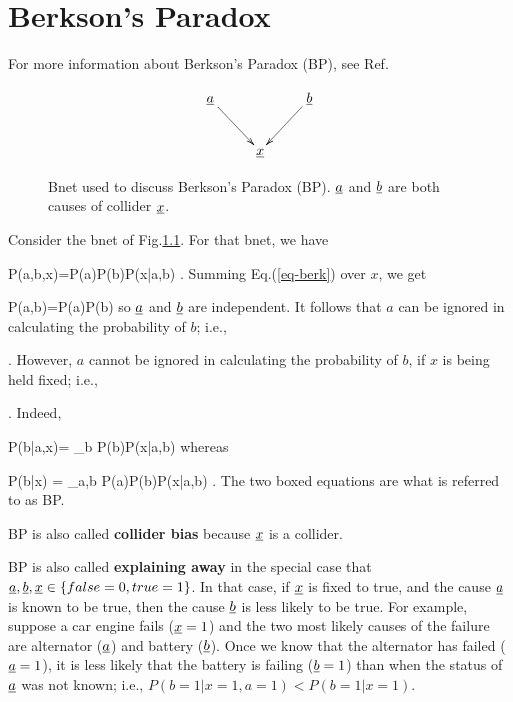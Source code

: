 \chapter{Berkson's Paradox}
\label{ch-berkson}

For more information
about Berkson's Paradox (BP), see
Ref.\cite{wiki-berkson}


\begin{figure}[h!]
$$
\xymatrix{
\rva\ar[rd]
&&\rvb\ar[ld]
\\
&\rvx
}
$$
\caption{
Bnet used to discuss Berkson's Paradox (BP).
${\underline{a}}$ and ${\underline{b}}$ are both causes of
collider
${\underline{x}}$.}
\label{fig-berkson-bnet}
\end{figure}

Consider the bnet of Fig.\ref{fig-berkson-bnet}.
For that bnet, we have

\beq
P(a,b,x)=P(a)P(b)P(x|a,b)
\;.
\label{eq-berk}
\eeq
Summing Eq.(\ref{eq-berk}) over $x$, we get

\beq
P(a,b)=P(a)P(b)
\eeq
so ${\underline{a}}$ and ${\underline{b}}$ are independent.
It follows that
$a$ can be ignored in calculating
the probability of $b$; i.e.,

\beq
{}
\;.
\eeq
However,
$a$ cannot be ignored in calculating
the probability of $b$,
if $x$ is being held fixed; i.e., 
 

\beq
{}
\;.
\eeq
Indeed,

\beq
P(b|a,x)=
{\sum_b P(b)P(x|a,b)}
\eeq
whereas

\beq
P(b|x)
=
{\sum_{a,b} P(a)P(b)P(x|a,b)}
\;.
\eeq
The two boxed 
equations are
what is referred to as BP.


BP is also called  {\bf collider bias} because 
${\underline{x}}$ is a collider.

BP is also called {\bf explaining away}
in the special case that
${\underline{a}},{\underline{b}}, {\underline{x}}\in \{false=0, true=1\}$.
In that case, if ${\underline{x}}$ is fixed
to true, and the cause
${\underline{a}}$ is known to be true, 
then the cause ${\underline{b}}$ is
less likely
to be true.
For example,
suppose a car engine fails (${\underline{x}}=1$)
and the two most likely
causes of the failure
are alternator (${\underline{a}}$)
and battery (${\underline{b}}$).
Once we know
that the alternator has failed
 (${\underline{a}}=1$), it is 
less likely that the
battery is failing (${\underline{b}}=1$)
than when the status of
${\underline{a}}$ was not known; i.e., 
$P(b=1|x=1,a=1)<P(b=1|x=1)$.


